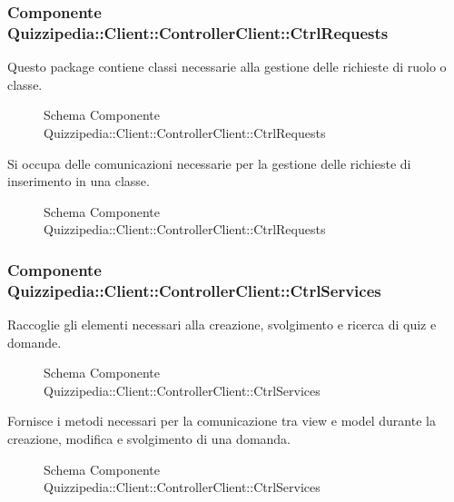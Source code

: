 \subsubsection{Componente Quizzipedia::Client::ControllerClient::CtrlRequests}
Questo package contiene classi necessarie alla gestione delle richieste di ruolo o classe.
\begin{figure}[H]
\centering
\noindent{}
\caption{Schema Componente Quizzipedia::Client::ControllerClient::CtrlRequests}
\end{figure}
Si occupa delle comunicazioni necessarie per la gestione delle richieste di inserimento in una classe.
\begin{figure}[H]
\centering
\noindent{}
\caption{Schema Componente Quizzipedia::Client::ControllerClient::CtrlRequests}
\end{figure}
\subsubsection{Componente Quizzipedia::Client::ControllerClient::CtrlServices}
Raccoglie gli elementi necessari alla creazione, svolgimento e ricerca di quiz e domande.
\begin{figure}[H]
\centering
\noindent{}
\caption{Schema Componente Quizzipedia::Client::ControllerClient::CtrlServices}
\end{figure}
Fornisce i metodi necessari per la comunicazione tra view e model durante la creazione, modifica e svolgimento di una domanda.
\begin{figure}[H]
\centering
\noindent{}
\caption{Schema Componente Quizzipedia::Client::ControllerClient::CtrlServices}
\end{figure}
